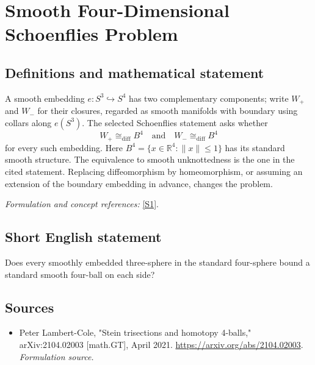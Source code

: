 \documentclass[11pt]{article}
\begin{document}
\section*{\texorpdfstring{Smooth Four-Dimensional Schoenflies Problem}{Smooth Four-Dimensional Schoenflies Problem}}\label{165}
\subsection{Definitions and mathematical statement}
A smooth embedding $e:S^3\hookrightarrow S^4$ has two complementary components; write $W_+$ and $W_-$ for their closures, regarded as smooth manifolds with boundary using collars along $e(S^3)$. The selected Schoenflies statement asks whether
\[
 W_+\cong_{\mathrm{diff}}B^4\quad\text{and}\quad W_-\cong_{\mathrm{diff}}B^4
\]
for every such embedding. Here $B^4=\{x\in{\mathbb{R}}^4:\|x\|\le1\}$ has its standard smooth structure. The equivalence to smooth unknottedness is the one in the cited statement. Replacing diffeomorphism by homeomorphism, or assuming an extension of the boundary embedding in advance, changes the problem.
\par\smallskip\textit{Formulation and concept references:} \href{https://arxiv.org/abs/2104.02003}{[S1]}.

\subsection{Short English statement}
Does every smoothly embedded three-sphere in the standard four-sphere bound a standard smooth four-ball on each side?
\subsection{Sources}
\begin{itemize}
\item[S1]Peter Lambert-Cole, "Stein trisections and homotopy 4-balls," arXiv:2104.02003 [math.GT], April 2021.
\url{https://arxiv.org/abs/2104.02003}.
\textit{Formulation source.}
\end{itemize}
\end{document}
